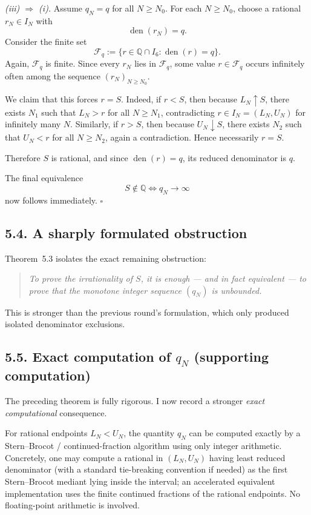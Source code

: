\smallskip
\noindent\emph{(iii) \(\Rightarrow\) (i).}
Assume \(q_N=q\) for all \(N\ge N_0\). For each \(N\ge N_0\), choose a rational \(r_N\in I_N\) with
\[
\operatorname{den}(r_N)=q.
\]
Consider the finite set
\[
\mathcal F_q:=\{r\in \mathbb Q\cap I_6 : \operatorname{den}(r)=q\}.
\]
Again, \(\mathcal F_q\) is finite. Since every \(r_N\) lies in \(\mathcal F_q\), some value \(r\in\mathcal F_q\) occurs infinitely often among the sequence \((r_N)_{N\ge N_0}\).

We claim that this forces \(r=S\). Indeed, if \(r<S\), then because \(L_N\uparrow S\), there exists \(N_1\) such that \(L_N>r\) for all \(N\ge N_1\), contradicting \(r\in I_N=(L_N,U_N)\) for infinitely many \(N\). Similarly, if \(r>S\), then because \(U_N\downarrow S\), there exists \(N_2\) such that \(U_N<r\) for all \(N\ge N_2\), again a contradiction. Hence necessarily \(r=S\).

Therefore \(S\) is rational, and since \(\operatorname{den}(r)=q\), its reduced denominator is \(q\).

The final equivalence
\[
S\notin\mathbb Q \iff q_N\to\infty
\]
now follows immediately. \hfill$\square$

\subsection*{5.4. A sharply formulated obstruction}

Theorem~5.3 isolates the exact remaining obstruction:
\begin{quote}
\emph{To prove the irrationality of \(S\), it is enough --- and in fact equivalent --- to prove that the monotone integer sequence \((q_N)\) is unbounded.}
\end{quote}
This is stronger than the previous round's formulation, which only produced isolated denominator exclusions.

\subsection*{5.5. Exact computation of \(q_N\) (supporting computation)}

The preceding theorem is fully rigorous. I now record a stronger \emph{exact computational} consequence.

For rational endpoints \(L_N<U_N\), the quantity \(q_N\) can be computed exactly by a Stern--Brocot / continued-fraction algorithm using only integer arithmetic. Concretely, one may compute a rational in \((L_N,U_N)\) having least reduced denominator (with a standard tie-breaking convention if needed) as the first Stern--Brocot mediant lying inside the interval; an accelerated equivalent implementation uses the finite continued fractions of the rational endpoints. No floating-point arithmetic is involved.

